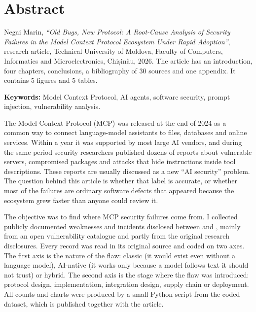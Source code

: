 \chapter*{Abstract}

\par Negai Marin, \textit{``Old Bugs, New Protocol: A Root-Cause Analysis of Security Failures in the Model Context Protocol Ecosystem Under Rapid Adoption''}, research article, Technical University of Moldova, Faculty of Computers, Informatics and Microelectronics, Chișinău, 2026. The article has an introduction, four chapters, conclusions, a bibliography of 30 sources and one appendix. It contains 5 figures and 5 tables.

\vspace{0.3cm}
\par \noindent \textbf{Keywords:} Model Context Protocol, AI agents, software security, prompt injection, vulnerability analysis.
\vspace{0.3cm}

\par The Model Context Protocol (MCP) was released at the end of 2024 as a common way to connect language-model assistants to files, databases and online services. Within a year it was supported by most large AI vendors, and during the same period security researchers published dozens of reports about vulnerable servers, compromised packages and attacks that hide instructions inside tool descriptions. These reports are usually discussed as a new ``AI security'' problem. The question behind this article is whether that label is accurate, or whether most of the failures are ordinary software defects that appeared because the ecosystem grew faster than anyone could review it.

\par The objective was to find where MCP security failures come from. I collected \nRecords{} publicly documented weaknesses and incidents disclosed between \firstDisclosure{} and \lastDisclosure{}, mainly from an open vulnerability catalogue and partly from the original research disclosures. Every record was read in its original source and coded on two axes. The first axis is the nature of the flaw: classic (it would exist even without a language model), AI-native (it works only because a model follows text it should not trust) or hybrid. The second axis is the stage where the flaw was introduced: protocol design, implementation, integration design, supply chain or deployment. All counts and charts were produced by a small Python script from the coded dataset, which is published together with the article.

